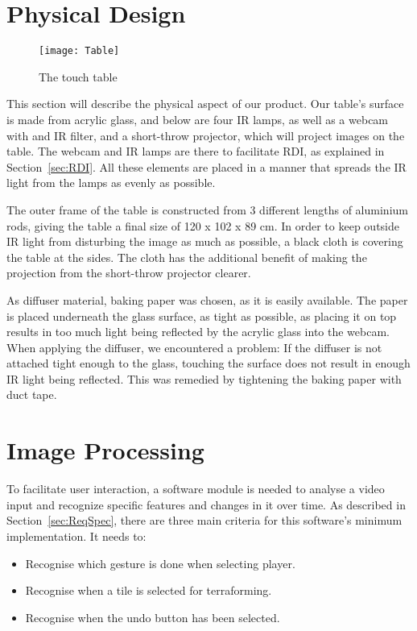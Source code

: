 \section{Physical Design} 
\begin{figure} [!h]
\centering \texttt{[image: Table]}
\label{Fig:Table} \caption{The touch table}
\end{figure}
This section will describe the physical aspect of our product.
Our table's surface is made from acrylic glass, and below are four IR lamps, as well as a webcam with and IR filter, and a short-throw projector, which will project images on the table. The webcam and IR lamps are there to facilitate RDI, as explained in Section~\ref{sec:RDI}. All these elements are placed in a manner that spreads the IR light from the lamps as evenly as possible.

The outer frame of the table is constructed from 3 different lengths of aluminium rods, giving the table a final size of 120 x 102 x 89 cm.
In order to keep outside IR light from disturbing the image as much as possible, a black cloth is covering the table at the sides. The cloth has the additional benefit of making the projection from the short-throw projector clearer. 

As diffuser material, baking paper was chosen, as it is easily available. The paper is placed underneath the glass surface, as tight as possible, as placing it on top results in too much light being reflected by the acrylic glass into the webcam. When applying the diffuser, we encountered a problem: If the diffuser is not attached tight enough to the glass, touching the surface does not result in enough IR light being reflected. This was remedied by tightening the baking paper with duct tape.

\section{Image Processing}
To facilitate user interaction, a software module is needed to analyse a video input and recognize specific features and changes in it over time. As described in Section~\ref{sec:ReqSpec}, there are three main criteria for this software's minimum implementation. It needs to:
\begin{itemize}
\item Recognise which gesture is done when selecting player.
\item Recognise when a tile is selected for terraforming.
\item Recognise when the undo button has been selected.
\end{itemize}

